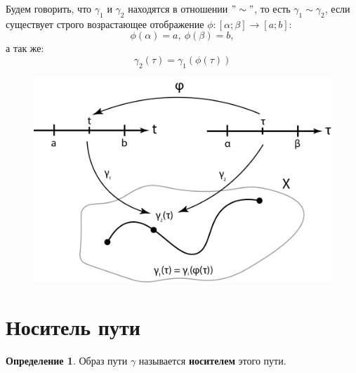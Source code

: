 \documentclass{report}
\theoremstyle{definition}
\newtheorem*{definition}{Определение}
\begin{document}
Будем говорить, что $\gamma_1$ и $\gamma_2$ находятся в отношении $"\sim"$, то есть $\gamma_1 \sim \gamma_2$,
если существует строго возрастающее отображение $\phi:[\alpha;\beta]\rightarrow[a;b]:$
\begin{equation*}
    \phi(\alpha) = a, \ \phi(\beta) = b,
\end{equation*}
а так же:
\begin{equation*}
    \gamma_2(\tau) = \gamma_1(\phi(\tau))
\end{equation*}
\begin{figure}[H]
    \begin{center}
        \includegraphics[scale=0.2]{graph7.png}\label{figure7}
    \end{center}
\end{figure}

\section{Носитель пути}

\begin{definition}
    Образ пути $\gamma$ называется \textbf{носителем} этого пути.
\end{definition}
\end{document}
